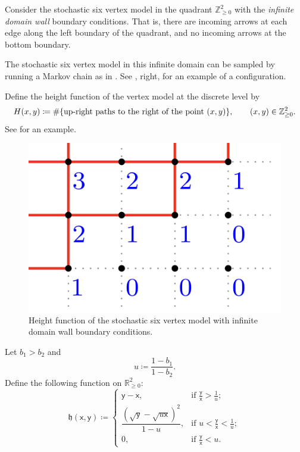 \documentclass[letterpaper,11pt,oneside,reqno]{article}
\numberwithin{equation}{section}
\theoremstyle{definition}
\theoremstyle{remark}
\begin{document}
Consider the stochastic six vertex model 
in the quadrant $\mathbb{Z}_{\ge0}^{2}$
with 
the \emph{infinite domain wall}
boundary conditions. That is, there are incoming arrows at each edge along the left 
boundary of the quadrant, and no incoming arrows at the bottom boundary.

The stochastic six vertex model in this infinite domain
can be sampled by running a Markov chain as in .
See , right, for an example of a configuration.

Define the height function of the vertex model at the discrete level
by
\begin{equation}
	\label{eq:height_function}
	H(x,y)\coloneqq \#\{\textnormal{up-right paths to the right of the point $(x,y)$} \},
	\qquad (x,y)\in \mathbb{Z}_{\ge0}^2.
\end{equation}
See
for an example.

\begin{figure}[htpb]
	\centering
	\includegraphics[width=.3\textwidth]{./images/s6v_height_function.png}
	\caption{Height function of the stochastic six vertex model with infinite domain wall
	boundary conditions.}
	\label{fig:s6v_height_function}
\end{figure}

Let $b_1>b_2$ and
\begin{equation}
	\label{eq:u_spectral_parameter}
	u\coloneqq \frac{1-b_1}{1-b_2}.
\end{equation}
Define the following function on $\mathbb{R}_{\ge0}^{2}$:
\begin{equation}
	\label{eq:limit_shape_height_function}
	\mathfrak{h}(\mathsf{x},\mathsf{y})\coloneqq
	\begin{cases}
		\mathsf{y}-\mathsf{x},
		& \text{if } \frac{\mathsf{y}}{\mathsf{x}} > \frac{1}{u} ;\\
		\dfrac{(\sqrt{\mathsf{y}} - \sqrt{u \mathsf{x}})^2}{1 - u}, & \text{if } u < \frac{\mathsf{y}}{\mathsf{x}} < \frac{1}{u}; \\
		0,&
		\text{if } \frac{\mathsf{y}}{\mathsf{x}} < u.
	\end{cases}
\end{equation}
\end{document}
